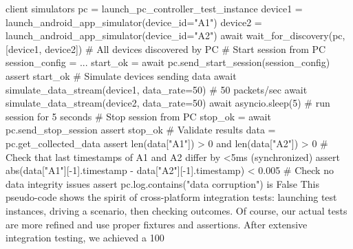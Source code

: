 client simulators pc = launch_pc_controller_test_instance device1 = launch_android_app_simulator(device_id="A1") device2 = launch_android_app_simulator(device_id="A2") await wait_for_discovery(pc, [device1, device2]) # All devices discovered by PC # Start session from PC session_config = {...} start_ok = await pc.send_start_session(session_config) assert start_ok # Simulate devices sending data await simulate_data_stream(device1, data_rate=50) # 50 packets/sec await simulate_data_stream(device2, data_rate=50) await asyncio.sleep(5) # run session for 5 seconds # Stop session from PC stop_ok = await pc.send_stop_session assert stop_ok # Validate results data = pc.get_collected_data assert len(data["A1"]) > 0 and len(data["A2"]) > 0 # Check that last timestamps of A1 and A2 differ by <5ms (synchronized) assert abs(data["A1"][-1].timestamp - data["A2"][-1].timestamp) < 0.005 # Check no data integrity issues assert pc.log.contains("data corruption") is False This pseudo-code shows the spirit of cross-platform integration tests: launching test instances, driving a scenario, then checking outcomes. Of course, our actual tests are more refined and use proper fixtures and assertions. After extensive integration testing, we achieved a 100%